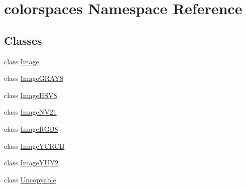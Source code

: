 \hypertarget{namespacecolorspaces}{}\section{colorspaces Namespace Reference}
\label{namespacecolorspaces}
\subsection*{Classes}
\begin{DoxyCompactItemize}
\item 
class \hyperlink{classcolorspaces_1_1_image}{Image}
\item 
class \hyperlink{classcolorspaces_1_1_image_g_r_a_y8}{Image\+G\+R\+A\+Y8}
\item 
class \hyperlink{classcolorspaces_1_1_image_h_s_v8}{Image\+H\+S\+V8}
\item 
class \hyperlink{classcolorspaces_1_1_image_n_v21}{Image\+N\+V21}
\item 
class \hyperlink{classcolorspaces_1_1_image_r_g_b8}{Image\+R\+G\+B8}
\item 
class \hyperlink{classcolorspaces_1_1_image_y_c_r_c_b}{Image\+Y\+C\+R\+CB}
\item 
class \hyperlink{classcolorspaces_1_1_image_y_u_y2}{Image\+Y\+U\+Y2}
\item 
class \hyperlink{classcolorspaces_1_1_uncopyable}{Uncopyable}
\end{DoxyCompactItemize}
